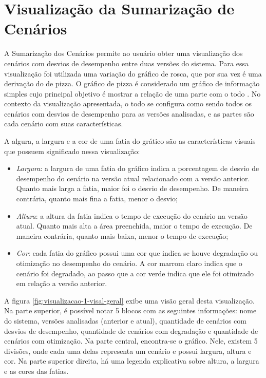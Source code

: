 \section{Visualização da Sumarização de Cenários} \label{subsec:visualizacao1}

A Sumarização dos Cenários permite ao usuário obter uma visualização dos cenários com desvios de desempenho entre duas versões do sistema. Para essa visualização foi utilizada uma variação do gráfico de rosca, que por sua vez é uma derivação do de pizza. O gráfico de pizza é considerado um gráfico de informação simples cujo principal objetivo é mostrar a relação de uma parte com o todo \cite{Spence2005}. No contexto da visualização apresentada, o todo se configura como sendo todos os cenários com desvios de desempenho para as versões analisadas, e as partes são cada cenário com suas características.

A algura, a largura e a cor de uma fatia do grático são as características visuais que possuem significado nessa visualização:

\begin{itemize}
   \item \textit{Largura}: a largura de uma fatia do gráfico indica a porcentagem de desvio de desempenho do cenário na versão atual relacionado com a versão anterior. Quanto mais larga a fatia, maior foi o desvio de desempenho. De maneira contrária, quanto mais fina a fatia, menor o desvio;
   \item \textit{Altura}: a altura da fatia indica o tempo de execução do cenário na versão atual. Quanto mais alta a área preenchida, maior o tempo de execução. De maneira contrária, quanto mais baixa, menor o tempo de execução;
   \item \textit{Cor}: cada fatia do gráfico possui uma cor que indica se houve degradação ou otimização no desempenho do cenário. A cor marrom claro indica que o cenário foi degradado, ao passo que a cor verde indica que ele foi otimizado em relação a versão anterior.
\end{itemize}

A figura \ref{fig:visualizacao-1-visal-geral} exibe uma visão geral desta visualização. Na parte superior, é possível notar 5 blocos com as seguintes informações: nome do sistema, versões analisadas (anterior e atual), quantidade de cenários com desvios de desempenho, quantidade de cenários com degradação e quantidade de cenários com otimização. Na parte central, encontra-se o gráfico. Nele, existem 5 divisões, onde cada uma delas representa um cenário e possui largura, altura e cor. Na parte superior direita, há uma legenda explicativa sobre altura, a largura e as cores das fatias.


